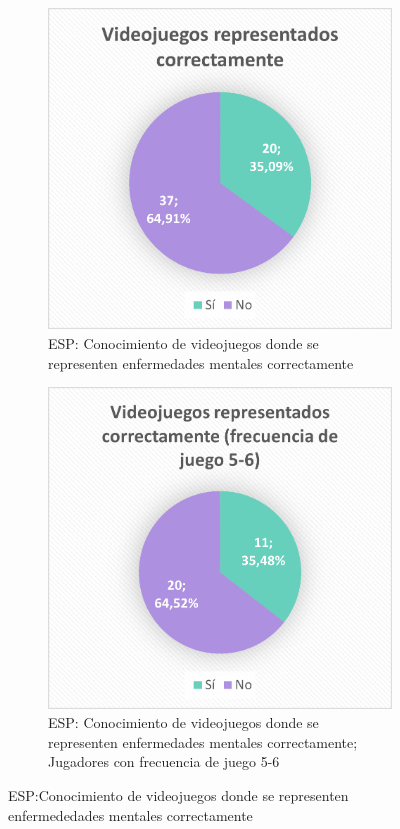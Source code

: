 \documentclass[12pt, a4paper,twoside,titlepage]{book}
\begin{document}
\begin{figure}
\centering
\begin{subfigure}{.5\textwidth}
  \centering
  \includegraphics[width=.95\linewidth]{ANEXO ESP/16AnexESPCorr}
  \caption{ESP: Conocimiento de videojuegos donde se representen enfermedades mentales correctamente}
\end{subfigure}%
\begin{subfigure}{.5\textwidth}
  \centering
  \includegraphics[width=.95\linewidth]{ANEXO ESP/17AnexESPCorr56}
  \caption{ESP: Conocimiento de videojuegos donde se representen enfermedades mentales correctamente; Jugadores con frecuencia de juego 5-6}
\end{subfigure}
\caption{ESP:Conocimiento de videojuegos donde se representen enfermededades mentales correctamente}
\label{fig:ESPCorr}
\end{figure}
\end{document}
